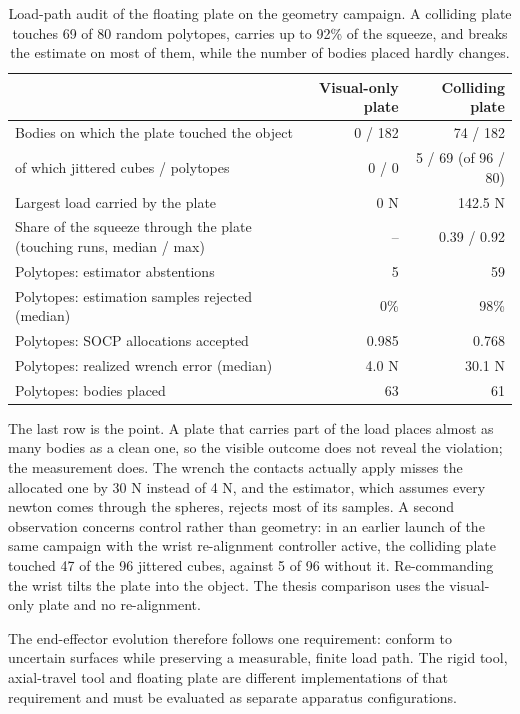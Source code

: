 \begin{table}[htbp]\centering\small
\begin{tabular}{@{}lrr@{}}\toprule
 & Visual-only plate & Colliding plate\\
\midrule
Bodies on which the plate touched the object & 0 / 182 & 74 / 182\\
\quad of which jittered cubes / polytopes & 0 / 0 & 5 / 69 (of 96 / 80)\\
Largest load carried by the plate & 0 N & 142.5 N\\
Share of the squeeze through the plate (touching runs, median / max) & -- & 0.39 / 0.92\\
Polytopes: estimator abstentions & 5 & 59\\
Polytopes: estimation samples rejected (median) & 0\% & 98\%\\
Polytopes: SOCP allocations accepted & 0.985 & 0.768\\
Polytopes: realized wrench error (median) & 4.0 N & 30.1 N\\
Polytopes: bodies placed & 63 & 61\\
\bottomrule\end{tabular}
\caption{Load-path audit of the floating plate on the geometry campaign. A colliding plate touches 69 of 80 random polytopes, carries up to 92\% of the squeeze, and breaks the estimate on most of them, while the number of bodies placed hardly changes.}
\label{tab:plate-collision}
\end{table}

The last row is the point. A plate that carries part of the load places almost as many bodies as a clean one, so the visible outcome does not reveal the violation; the measurement does. The wrench the contacts actually apply misses the allocated one by 30 N instead of 4 N, and the estimator, which assumes every newton comes through the spheres, rejects most of its samples. A second observation concerns control rather than geometry: in an earlier launch of the same campaign with the wrist re-alignment controller active, the colliding plate touched 47 of the 96 jittered cubes, against 5 of 96 without it. Re-commanding the wrist tilts the plate into the object. The thesis comparison uses the visual-only plate and no re-alignment.

The end-effector evolution therefore follows one requirement: conform to uncertain surfaces while preserving a measurable, finite load path. The rigid tool, axial-travel tool and floating plate are different implementations of that requirement and must be evaluated as separate apparatus configurations.

